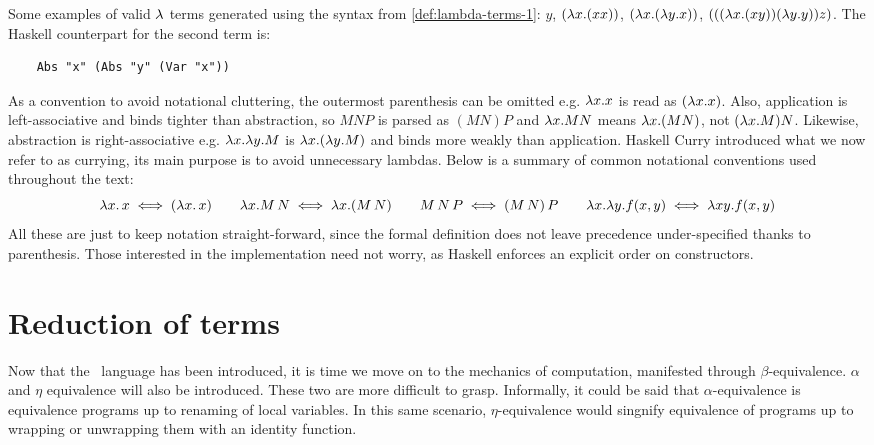 \begin{example} \label{ex:lambda-terms} Some examples of valid $\lambda$ terms generated using the syntax from \ref{def:lambda-terms-1}:
  \( y \),
  \( (\lambda x. (x x)) \),
  \( (\lambda x. (\lambda y. x)) \),
  \( (((\lambda x. (x y)) (\lambda y. y)) z) \).
  The Haskell counterpart for the second term is:
  \begin{verbatim}
    Abs "x" (Abs "y" (Var "x"))
  \end{verbatim}
\end{example}
As a convention to avoid notational cluttering, the outermost parenthesis can be omitted e.g. $\lambda x.x $ is read as $ ( \lambda x.x ) $. Also, application is left-associative  and binds tighter than abstraction, so $M N P$ is parsed as $(M N) P$ and $\lambda x . M N$ means $\lambda x . (M N)$, not $(\lambda x . M) N$. Likewise, abstraction is right-associative e.g. $\lambda x . \lambda y . M$ is $\lambda x . (\lambda y . M)$ and binds more weakly than application. Haskell Curry introduced what we now refer to as currying, its main purpose is to avoid unnecessary lambdas. Below is a summary of common notational conventions used throughout the text:
\[ \lambda x . \, x \iff ( \lambda x . \, x ) \qquad \lambda x. M \, N \iff \lambda x. (M \, N) \qquad  M \, N \, P \iff (M \, N) \, P \qquad \lambda x. \lambda y. f(x,y) \iff \lambda xy. f(x,y) \]
All these are just to keep notation straight-forward, since the formal definition does not leave precedence under-specified thanks to parenthesis. Those interested in the implementation need not worry, as Haskell enforces an explicit order on constructors.
\section{\centering Reduction of terms}
Now that the \lcalc \ language has been introduced, it is time we move on to the mechanics of computation, manifested through $\beta$-equivalence. $\alpha$ and $\eta$ equivalence will also be introduced. These two are more difficult to grasp. Informally, it could be said that $\alpha$-equivalence is equivalence programs up to renaming of local variables. In this same scenario, $\eta$-equivalence would singnify equivalence of programs up to wrapping or unwrapping them with an identity function.
